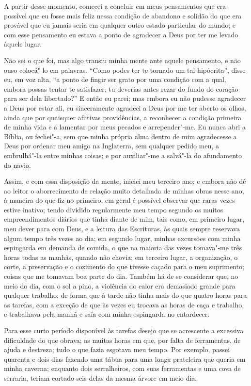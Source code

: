 A partir desse momento, comecei a concluir em meus pensamentos que era
possível que eu fosse mais feliz nessa condição de abandono e solidão do
que era provável que eu jamais seria em qualquer outro estado particular
do mundo; e com esse pensamento eu estava a ponto de agradecer a Deus
por ter me levado àquele lugar.

Não sei o que foi, mas algo transiu minha mente ante aquele pensamento,
e não ouso colocá"-lo em palavras. ``Como podes ter te tornado um tal
hipócrita'', disse eu, em voz alta, ``a ponto de fingir ser grato por
uma condição com a qual, embora possas tentar te satisfazer, tu deverias
antes rezar do fundo do coração para ser dela libertado?'' E então eu
parei; mas embora eu não pudesse agradecer a Deus por estar ali, eu
sinceramente agradeci a Deus por me ter aberto os olhos, ainda que por
quaisquer aflitivas providências, a reconhecer a condição primeira de
minha vida e a lamentar por meus pecados e arrepender"-me. Eu nunca abri
a Bíblia, ou fechei"-a, sem que minha própria alma dentro de mim
agradecesse a Deus por ordenar meu amigo na Inglaterra, sem qualquer
pedido meu, a embrulhá"-la entre minhas coisas; e por auxiliar"-me a
salvá"-la do afundamento do navio.

Assim, e com essa disposição da mente, iniciei meu terceiro ano; e
embora não dê ao leitor o aborrecimento de relação muito detalhada de
minhas obras nesse ano, à maneira do que fiz no primeiro, em geral é
possível observar que raras vezes estive inativo; tendo dividido
regularmente meu tempo segundo os muitos empreendimentos diários que
tinha diante de mim, tais como, em primeiro lugar, meu dever para com
Deus, e a leitura das Escrituras, às quais sempre reservava algum tempo
três vezes ao dia; em segundo lugar, minhas excursões com minha
espingarda em demanda de comida, o que na maioria das vezes tomava"-me
três horas todas as manhãs, quando não chovia; em terceiro lugar, a
organização, o corte, a preservação e o cozimento do que tivesse caçado
para o meu suprimento; coisas que me tomavam boa parte do dia. Também há
de se considerar que, no meio do dia, com o sol a pino, a violência do
calor era demasiado grande para qualquer trabalho; de forma que à tarde
não tinha mais do que quatro horas para as tarefas, com a exceção de que
às vezes eu trocava as horas de caça e trabalho, e trabalhava pela manhã
e saía com minha espingarda no entardecer.

Para esse curto período disponível às tarefas desejo que se acrescente a
excessiva dificuldade do que obrava; as muitas horas em que, por falta
de ferramentas, de ajuda e destreza; tudo o que fazia esgotava meu
tempo. Por exemplo, passei quarenta e dois dias fazendo uma tábua para
uma longa prateleira que queria em minha caverna; enquanto dois
serralheiros, com suas ferramentas e uma cova de serraria, teriam
cortado seis delas da mesma árvore em meio dia.


